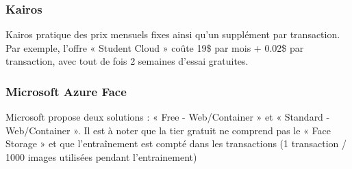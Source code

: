\subsubsection{Kairos}

Kairos pratique des prix mensuels fixes ainsi qu’un supplément par transaction. Par exemple, l’offre « Student
Cloud » coûte 19\$ par mois + 0.02\$ par transaction, avec tout de fois 2 semaines d’essai gratuites.

\subsubsection{Microsoft Azure Face}

Microsoft propose deux solutions : « Free - Web/Container » et « Standard - Web/Container ». Il est à noter que la
tier gratuit ne comprend pas le « Face Storage » et que l’entraînement est compté dans les transactions (1
transaction / 1000 images utilisées pendant l’entrainement)

